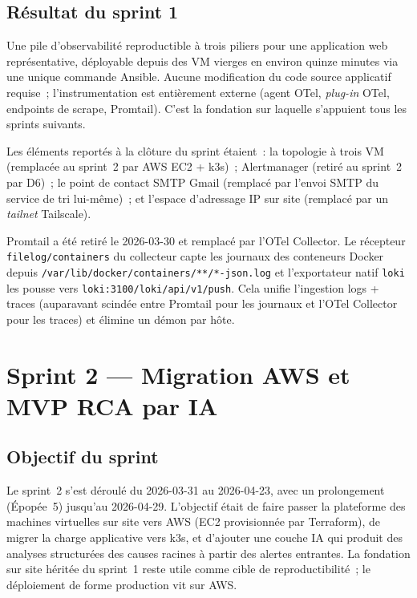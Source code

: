 \documentclass[11pt,a4paper,oneside]{report}
\begin{document}
\section{Résultat du sprint 1}

\begin{winbox}[title={Livrables du sprint 1}]
Une pile d'observabilité reproductible à trois piliers pour une
application web représentative, déployable depuis des VM vierges en
environ quinze minutes via une unique commande Ansible. Aucune
modification du code source applicatif requise~; l'instrumentation
est entièrement externe (agent OTel, \emph{plug-in} OTel, endpoints
de scrape, Promtail). C'est la fondation sur laquelle s'appuient
tous les sprints suivants.
\end{winbox}

Les éléments reportés à la clôture du sprint étaient~: la topologie
à trois VM (remplacée au sprint~2 par AWS EC2 + k3s)~; Alertmanager
(retiré au sprint~2 par D6)~; le point de contact SMTP Gmail
(remplacé par l'envoi SMTP du service de tri lui-même)~; et l'espace
d'adressage IP sur site (remplacé par un \emph{tailnet} Tailscale).

Promtail a été retiré le 2026-03-30 et remplacé par l'OTel Collector.
Le récepteur \texttt{filelog/containers} du collecteur capte les
journaux des conteneurs Docker depuis
\texttt{/var/lib/docker/containers/**/*-json.log} et l'exportateur
natif \texttt{loki} les pousse vers
\texttt{loki:3100/loki/api/v1/push}. Cela unifie l'ingestion logs +
traces (auparavant scindée entre Promtail pour les journaux et l'OTel
Collector pour les traces) et élimine un démon par hôte.

\chapter{Sprint 2 --- Migration AWS et MVP RCA par IA}
\label{ch:sprint2}

\section{Objectif du sprint}

Le sprint~2 s'est déroulé du 2026-03-31 au 2026-04-23, avec un
prolongement (Épopée~5) jusqu'au 2026-04-29. L'objectif était de
faire passer la plateforme des machines virtuelles sur site vers
AWS (EC2 provisionnée par Terraform), de migrer la charge
applicative vers k3s, et d'ajouter une couche IA qui produit des
analyses structurées des causes racines à partir des alertes
entrantes. La fondation sur site héritée du sprint~1 reste utile
comme cible de reproductibilité~; le déploiement de forme
production vit sur AWS.
\end{document}
